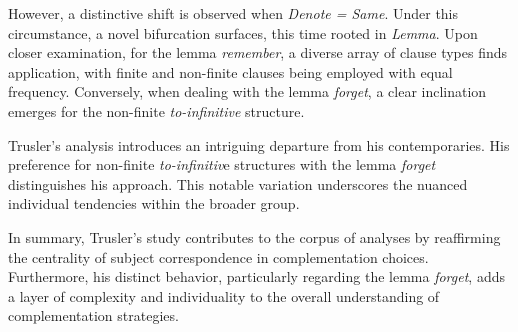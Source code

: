 \documentclass[final]{clv3} %
\begin{document}
However, a distinctive shift is observed when \textit{\textit{Denote} = Same}. Under this circumstance, a novel bifurcation surfaces, this time rooted in \textit{Lemma}. Upon closer examination, for the lemma \textit{remember}, a diverse array of clause types finds application, with finite and non-finite clauses being employed with equal frequency. Conversely, when dealing with the lemma \textit{forget}, a clear inclination emerges for the non-finite \textit{\textit{to-infinitive}} structure.

Trusler's analysis introduces an intriguing departure from his contemporaries. His preference for non-finite \textit{to-infinitiv}e structures with the lemma \textit{forget} distinguishes his approach. This notable variation underscores the nuanced individual tendencies within the broader group.

In summary, Trusler's study contributes to the corpus of analyses by reaffirming the centrality of subject correspondence in complementation choices. Furthermore, his distinct behavior, particularly regarding the lemma \textit{forget}, adds a layer of complexity and individuality to the overall understanding of complementation strategies.
\end{document}
